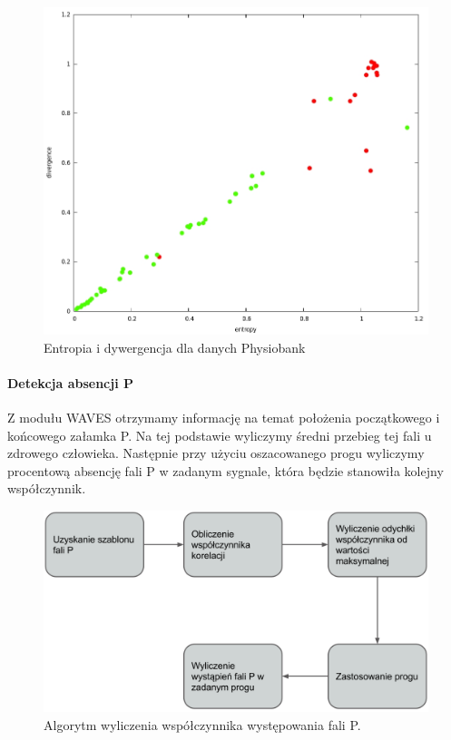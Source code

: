 \begin{figure}[ht]
\centering
\includegraphics[width=12cm]{ATRIAL_FIBR/img/RRResults.jpg}
\caption{Entropia i dywergencja dla danych Physiobank}
\label{fig:RRResults}
\end{figure}

\paragraph{Detekcja absencji P}
Z modułu WAVES otrzymamy informację na temat położenia początkowego i końcowego załamka P. 
Na tej podstawie wyliczymy średni przebieg tej fali u zdrowego człowieka. 
Następnie przy użyciu oszacowanego progu wyliczymy procentową absencję fali P w zadanym sygnale, 
która będzie stanowiła kolejny współczynnik.
\begin{figure}
  \centering
  \includegraphics[width=12cm]{ATRIAL_FIBR/img/PMethodFlow.png}
  \caption{Algorytm wyliczenia współczynnika występowania fali P.}
\end{figure}

